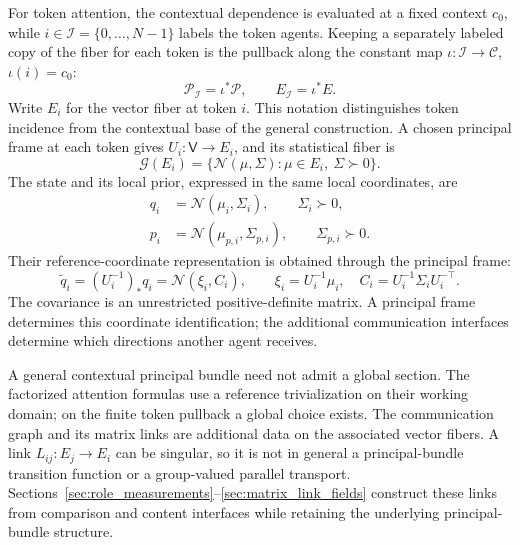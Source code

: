 \documentclass[twoside,11pt]{article}
\begin{document}
For token attention, the contextual dependence is evaluated at a fixed context \(c_0\), while \(i\in\mathcal I=\{0,\ldots,N-1\}\) labels the token agents. Keeping a separately labeled copy of the fiber for each token is the pullback along the constant map \(\iota:\mathcal I\to\mathcal C\), \(\iota(i)=c_0\):
\begin{equation}
\mathcal P_{\mathcal I}=\iota^*\mathcal P,
\qquad E_{\mathcal I}=\iota^*E.
\label{eq:token_bundle_pullback}
\end{equation}
Write \(E_i\) for the vector fiber at token \(i\). This notation distinguishes token incidence from the contextual base of the general construction. A chosen principal frame at each token gives \(U_i:\mathsf V\to E_i\), and its statistical fiber is
\begin{equation}
\mathcal G(E_i)=\{\mathcal N(\mu,\Sigma):\mu\in E_i,\ \Sigma\succ0\}.
\label{eq:overview_statistical_fiber}
\end{equation}
The state and its local prior, expressed in the same local coordinates, are
\begin{align}
q_i&=\mathcal N(\mu_i,\Sigma_i),\qquad \Sigma_i\succ0,\label{eq:gaussian_states}\\
p_i&=\mathcal N(\mu_{p,i},\Sigma_{p,i}),\qquad \Sigma_{p,i}\succ0.\label{eq:base_priors}
\end{align}
Their reference-coordinate representation is obtained through the principal frame:
\begin{equation}
\widetilde q_i=(U_i^{-1})_*q_i
=\mathcal N(\xi_i,C_i),\qquad
\xi_i=U_i^{-1}\mu_i,\quad
C_i=U_i^{-1}\Sigma_iU_i^{-\top}.
\label{eq:overview_reference_state}
\end{equation}
The covariance is an unrestricted positive-definite matrix. A principal frame determines this coordinate identification; the additional communication interfaces determine which directions another agent receives.

A general contextual principal bundle need not admit a global section. The factorized attention formulas use a reference trivialization on their working domain; on the finite token pullback a global choice exists. The communication graph and its matrix links are additional data on the associated vector fibers. A link \(L_{ij}:E_j\to E_i\) can be singular, so it is not in general a principal-bundle transition function or a group-valued parallel transport. Sections~\ref{sec:role_measurements}--\ref{sec:matrix_link_fields} construct these links from comparison and content interfaces while retaining the underlying principal-bundle structure.
\end{document}
